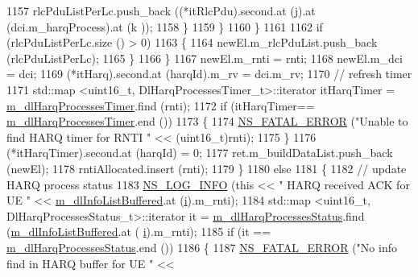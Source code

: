 \begin{DoxyCode}
1157                           rlcPduListPerLc.push\_back ((*itRlcPdu).second.at (j).at (dci.m\_harqProcess).at (k
      ));
1158                         \}
1159                     \}
1160                 \}
1161 
1162               \textcolor{keywordflow}{if} (rlcPduListPerLc.size () > 0)
1163                 \{
1164                   newEl.m\_rlcPduList.push\_back (rlcPduListPerLc);
1165                 \}
1166             \}
1167           newEl.m\_rnti = rnti;
1168           newEl.m\_dci = dci;
1169           (*itHarq).second.at (harqId).m\_rv = dci.m\_rv;
1170           \textcolor{comment}{// refresh timer}
1171           std::map <uint16\_t, DlHarqProcessesTimer\_t>::iterator itHarqTimer = 
      \hyperlink{classns3_1_1CqaFfMacScheduler_a2e130ab374b4770c3544495ba593f023}{m\_dlHarqProcessesTimer}.find (rnti);
1172           \textcolor{keywordflow}{if} (itHarqTimer== \hyperlink{classns3_1_1CqaFfMacScheduler_a2e130ab374b4770c3544495ba593f023}{m\_dlHarqProcessesTimer}.end ())
1173             \{
1174               \hyperlink{group__fatal_ga5131d5e3f75d7d4cbfd706ac456fdc85}{NS\_FATAL\_ERROR} (\textcolor{stringliteral}{"Unable to find HARQ timer for RNTI "} << (uint16\_t)rnti);
1175             \}
1176           (*itHarqTimer).second.at (harqId) = 0;
1177           ret.m\_buildDataList.push\_back (newEl);
1178           rntiAllocated.insert (rnti);
1179         \}
1180       \textcolor{keywordflow}{else}
1181         \{
1182           \textcolor{comment}{// update HARQ process status}
1183           \hyperlink{group__logging_gafbd73ee2cf9f26b319f49086d8e860fb}{NS\_LOG\_INFO} (\textcolor{keyword}{this} << \textcolor{stringliteral}{" HARQ received ACK for UE "} << 
      \hyperlink{classns3_1_1CqaFfMacScheduler_aabc929a8c1c30338a5fa0826bb7cd2b8}{m\_dlInfoListBuffered}.at (\hyperlink{bernuolliDistribution_8m_a6f6ccfcf58b31cb6412107d9d5281426}{i}).m\_rnti);
1184           std::map <uint16\_t, DlHarqProcessesStatus\_t>::iterator it = 
      \hyperlink{classns3_1_1CqaFfMacScheduler_ad68bd0730def22b00204de5f3a8fb109}{m\_dlHarqProcessesStatus}.find (\hyperlink{classns3_1_1CqaFfMacScheduler_aabc929a8c1c30338a5fa0826bb7cd2b8}{m\_dlInfoListBuffered}.at (
      \hyperlink{bernuolliDistribution_8m_a6f6ccfcf58b31cb6412107d9d5281426}{i}).m\_rnti);
1185           \textcolor{keywordflow}{if} (it == \hyperlink{classns3_1_1CqaFfMacScheduler_ad68bd0730def22b00204de5f3a8fb109}{m\_dlHarqProcessesStatus}.end ())
1186             \{
1187               \hyperlink{group__fatal_ga5131d5e3f75d7d4cbfd706ac456fdc85}{NS\_FATAL\_ERROR} (\textcolor{stringliteral}{"No info find in HARQ buffer for UE "} << 

\end{DoxyCode}
